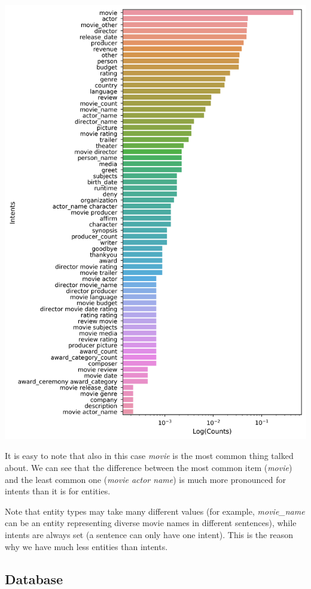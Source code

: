 \documentclass[11pt,a4paper]{article}
\begin{document}
		\hspace*{-1.7cm}\includegraphics[scale=0.5]{intents_frequency}
		
		It is easy to note that also in this case \textit{movie} is the most common thing talked about. We can see that the difference between the most common item (\textit{movie}) and the least common one (\textit{movie actor name}) is much more pronounced for intents than it is for entities.
		
		Note that entity types may take many different values (for example, \textit{movie\_name} can be an entity representing diverse movie names in different sentences), while intents are always set (a sentence can only have one intent). This is the reason why we have much less entities than intents.
		
	
	\subsection{Database}
	\label{ssec-database}
		
\end{document}
